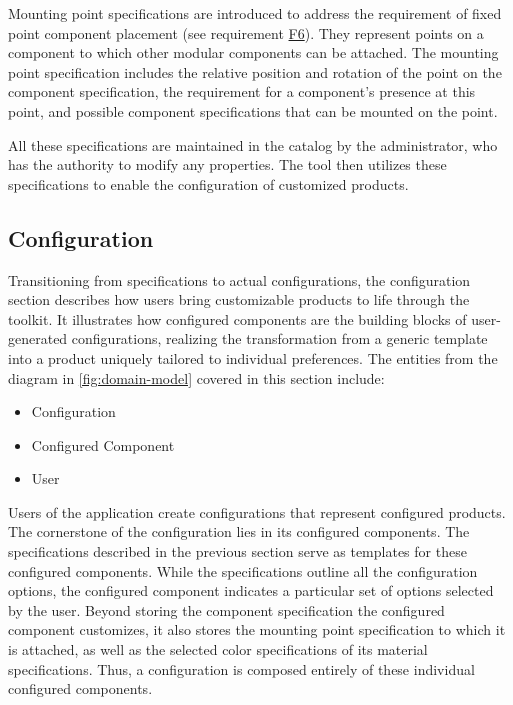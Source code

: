 Mounting point specifications are introduced to address the requirement of fixed point component placement (see requirement \hyperref[itm:F6]{F6}). They represent points on a component to which other modular components can be attached. The mounting point specification includes the relative position and rotation of the point on the component specification, the requirement for a component's presence at this point, and possible component specifications that can be mounted on the point.

All these specifications are maintained in the catalog by the administrator, who has the authority to modify any properties. The tool then utilizes these specifications to enable the configuration of customized products.


\subsection{Configuration}

Transitioning from specifications to actual configurations, the configuration section describes how users bring customizable products to life through the toolkit.
It illustrates how configured components are the building blocks of user-generated configurations, realizing the transformation from a generic template into a product uniquely tailored to individual preferences.
The entities from the diagram in \autoref{fig:domain-model} covered in this section include:
\begin{itemize}[label=\rectanglebullet]
    \item Configuration
    \item Configured Component
    \item User
\end{itemize}

Users of the application create configurations that represent configured products. The cornerstone of the configuration lies in its configured components. The specifications described in the previous section serve as templates for these configured components. While the specifications outline all the configuration options, the configured component indicates a particular set of options selected by the user. Beyond storing the component specification the configured component customizes, it also stores the mounting point specification to which it is attached, as well as the selected color specifications of its material specifications. Thus, a configuration is composed entirely of these individual configured components.


